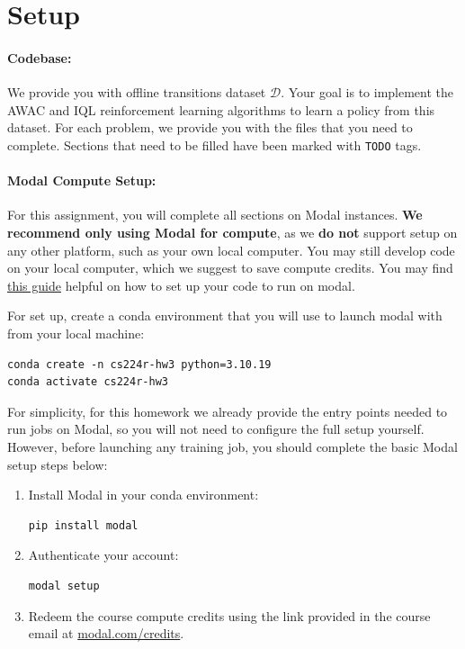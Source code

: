 \documentclass[12pt]{article}
\begin{document}
\section*{Setup}

\paragraph{Codebase:} We provide you with offline transitions dataset $\mathcal{D}$. Your goal is to implement the AWAC and IQL reinforcement learning algorithms to learn a policy from this dataset. For each problem, we provide you with the files that you need to complete. Sections that need to be filled have been marked with \texttt{TODO} tags.


\paragraph{Modal Compute Setup:} For this assignment, you will complete all sections on Modal instances. \textbf{We recommend only using Modal for compute}, as we \textbf{do not} support setup on any other platform, such as your own local computer. You may still develop code on your local computer, which we suggest to save compute credits. You may find \href{https://cs224r.stanford.edu/material/CS224R_compute_guide.pdf}{this guide} helpful on how to set up your code to run on modal. 

For set up, create a conda environment that you will use to launch modal with from your local machine:
\begin{tcolorbox}[width=\linewidth, sharp corners=all, colback=white!95!black]
\begin{verbatim}
conda create -n cs224r-hw3 python=3.10.19
conda activate cs224r-hw3
\end{verbatim}
\end{tcolorbox}


For simplicity, for this homework we already provide the entry points needed to run jobs on Modal, so you will not need to configure the full setup yourself. However, before launching any training job, you should complete the basic Modal setup steps below:
\begin{enumerate}
    \item Install Modal in your conda environment:
\begin{verbatim}
pip install modal
\end{verbatim}
    \item Authenticate your account:
\begin{verbatim}
modal setup
\end{verbatim}
    \item Redeem the course compute credits using the link provided in the course email at \href{https://modal.com/credits}{modal.com/credits}.
\end{enumerate}
\end{document}
